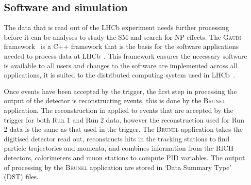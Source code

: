 
\subsection{Software and simulation}
\label{SoftwareSimulation}

The data that is read out of the LHCb experiment needs further processing before it can be analyses to study the SM and search for NP effects. The \textsc{Gaudi} framework~\cite{Mato:1998gfa} is a C++ framework that is the basis for the software applications needed to process data at LHCb~\cite{Antunes-Nobrega:835156}. This framework ensures the necessary software is available to all users and changes to the software are implemented across all applications, it is suited to the distributed computing system used in LHCb~\cite{Stagni:2012rs}. 


Once events have been accepted by the trigger, the first step in processing the output of the detector is reconstructing events, this is done by the \textsc{Brunel}~\cite{Brunel} application. The reconstruction in applied to events that are accepted by the trigger for both Run 1 and Run 2 data, however the reconstruction used for Run 2 data is the same as that used in the trigger. The \textsc{Brunel} application takes the digitised detector read out, reconstructs hits in the tracking stations to find particle trajectories and momenta, and combines information from the RICH detectors, calorimeters and muon stations to compute PID variables. The output of processing by the \textsc{Brunel} application are stored in `Data Summary Type' (DST) files. 


